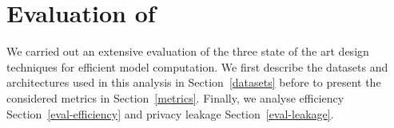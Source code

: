 \section{Evaluation of \method}\label{compare}










We carried out an extensive evaluation of the three state of the art design techniques for efficient model computation.
%
We first describe the datasets and architectures used in this analysis in Section~\ref{datasets} before to present the considered metrics in Section~\ref{metrics}. Finally, we analyse efficiency Section~\ref{eval-efficiency} and privacy leakage Section~\ref{eval-leakage}.




